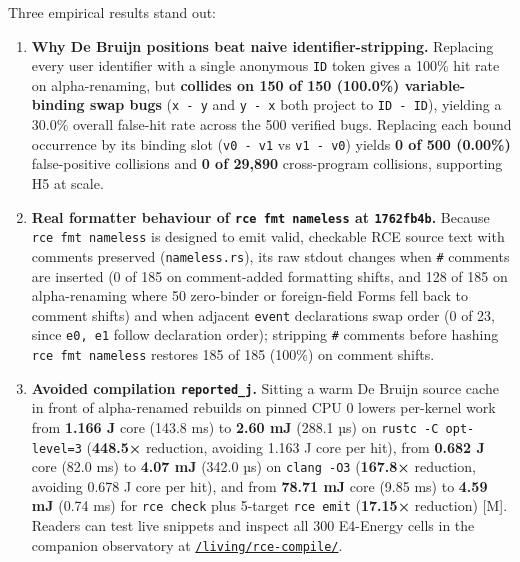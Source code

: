\documentclass[10pt,letterpaper]{article}
\providecommand{\tightlist}{\setlength{\itemsep}{1pt}\setlength{\parskip}{0pt}}
\begin{document}
Three empirical results stand out:

\begin{enumerate}
\def\labelenumi{\arabic{enumi}.}
\tightlist
\item
  \textbf{Why De Bruijn positions beat naive identifier-stripping.}
  Replacing every user identifier with a single anonymous \texttt{ID}
  token gives a 100\% hit rate on alpha-renaming, but \textbf{collides
  on 150 of 150 (100.0\%) variable-binding swap bugs} (\texttt{x\ -\ y}
  and \texttt{y\ -\ x} both project to \texttt{ID\ -\ ID}), yielding a
  30.0\% overall false-hit rate across the 500 verified bugs. Replacing
  each bound occurrence by its binding slot (\texttt{v0\ -\ v1} vs
  \texttt{v1\ -\ v0}) yields \textbf{0 of 500 (0.00\%)} false-positive
  collisions and \textbf{0 of 29,890} cross-program collisions,
  supporting H5 at scale.
\item
  \textbf{Real formatter behaviour of \texttt{rce\ fmt\ nameless} at
  \texttt{1762fb4b}.} Because \texttt{rce\ fmt\ nameless} is designed to
  emit valid, checkable RCE source text with comments preserved
  (\texttt{nameless.\allowbreak{}rs}), its raw stdout changes when \texttt{\#}
  comments are inserted (0 of 185 on comment-added formatting shifts,
  and 128 of 185 on alpha-renaming where 50 zero-binder or foreign-field
  Forms fell back to comment shifts) and when adjacent \texttt{event}
  declarations swap order (0 of 23, since \texttt{e0,\ e1} follow
  declaration order); stripping \texttt{\#} comments before hashing
  \texttt{rce\ fmt\ nameless} restores 185 of 185 (100\%) on comment
  shifts.
\item
  \textbf{Avoided compilation \texttt{reported\_\allowbreak{}j}.} Sitting a warm De
  Bruijn source cache in front of alpha-renamed rebuilds on pinned CPU 0
  lowers per-kernel work from \textbf{1.166 J} core (143.8 ms) to
  \textbf{2.60 mJ} (288.1 µs) on \texttt{rustc\ -\allowbreak{}C\ opt-\allowbreak{}level=3}
  (\textbf{448.5×} reduction, avoiding 1.163 J core per hit), from
  \textbf{0.682 J} core (82.0 ms) to \textbf{4.07 mJ} (342.0 µs) on
  \texttt{clang\ -\allowbreak{}O3} (\textbf{167.8×} reduction, avoiding 0.678 J core
  per hit), and from \textbf{78.71 mJ} core (9.85 ms) to \textbf{4.59
  mJ} (0.74 ms) for \texttt{rce\ check} plus 5-target \texttt{rce\ emit}
  (\textbf{17.15×} reduction) {[}M{]}. Readers can test live snippets
  and inspect all 300 E4-Energy cells in the companion observatory at
  \href{https://research.openie.dev/living/rce-compile/}{\texttt{/\allowbreak{}living/\allowbreak{}rce-\allowbreak{}compile/\allowbreak{}}}.
\end{enumerate}
\end{document}
